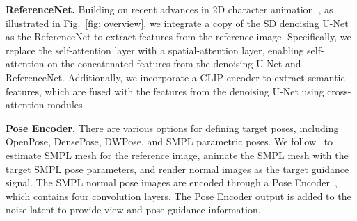 \noindent \textbf{ReferenceNet.}
Building on recent advances in 2D character animation~\cite{hu2024animate}, as illustrated in Fig.~\ref{fig: overview}, we integrate a copy of the SD denoising U-Net as the ReferenceNet to extract features from the reference image.
Specifically, we replace the self-attention layer with a spatial-attention layer, enabling self-attention on the concatenated features from the denoising U-Net and ReferenceNet. 
Additionally, we incorporate a CLIP encoder to extract semantic features, which are fused with the features from the denoising U-Net using cross-attention modules.


\noindent \textbf{Pose Encoder.}
There are various options for defining target poses, including OpenPose, DensePose, DWPose, and SMPL parametric poses.
We follow~\cite{zhu2024champ} to estimate SMPL mesh for the reference image, animate the SMPL mesh with the target SMPL pose parameters, and render normal images as the target guidance signal. 
The SMPL normal pose images are encoded through a Pose Encoder~\cite{hu2024animate}, which contains four convolution layers. 
The Pose Encoder output is added to the noise latent to provide view and pose guidance information.

